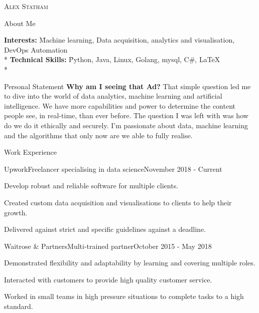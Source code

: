 \documentclass[a4paper]{article}
\newlength{\tabin}
\newlength{\secsep}
\newcommand{\lineunder}{\vspace*{-8pt} \\ \hspace*{-6pt} \hrulefill \\ \vspace*{-15pt}}
\newcommand{\name}[1]{\begin{center}\textsc{\Huge#1}\\\end{center}}
\newcommand{\contact}[1]{\begin{center}\color{contactgray}{\small#1}\end{center}}
\newenvironment{tabbedsection}[1]{
  \begin{list}{}{
      \setlength{\itemsep}{0pt}
      \setlength{\labelsep}{0pt}
      \setlength{\labelwidth}{0pt}
      \setlength{\leftmargin}{\tabin}
      \setlength{\rightmargin}{\tabin}
      \setlength{\listparindent}{0pt}
      \setlength{\parsep}{0pt}
      \setlength{\parskip}{0pt}
      \setlength{\partopsep}{0pt}
      \setlength{\topsep}{#1}
    }
  \item[]
}{\end{list}}
\newenvironment{nospacetabbing}{
    \begin{tabbing}
}{\end{tabbing}\vspace{-1.2em}}
\newenvironment{resume_header}{}{\vspace{0pt}}
\newenvironment{resume_section}[1]{
  \filbreak
  \vspace{2\secsep}
  \textsc{\large#1}
  \lineunder
  \begin{tabbedsection}{\secsep}
}{\end{tabbedsection}}
\newenvironment{resume_employer}[4]{
  \vspace{\secsep}
  \textbf{#1} \\ 
  \indent {\small #2} \hfill {\footnotesize#3 (#4)}
  \begin{tabbedsection}{0pt}
  \begin{subitems}
}{\end{subitems}\end{tabbedsection}}
\newenvironment{subitems}{
  \renewcommand{\labelitemi}{-}
  \begin{itemize}
      \setlength{\labelsep}{1em}
}{\end{itemize}}
\begin{document}
\begin{resume_header}
\name{Alex Statham}
\contact{alex.staham1998@gmail.com  $\bullet$ +447490973388 $\bullet$ astatham.com}
\end{resume_header}

\begin{resume_section}{About Me}
  \begin{nospacetabbing}
  \textbf{Interests:}  \= Machine learning,  Data acquisition, analytics and visualisation, DevOps Automation \\*
  \textbf{Technical Skills:}  \= Python, Java, Linux, Golang, mysql, C\#,  \LaTeX\\*
  \end{nospacetabbing}
\end{resume_section}

\begin{resume_section}{Personal Statement}
  \textbf{Why am I seeing that Ad?} That simple question led  me to dive into the world of data analytics, machine learning and  artificial intelligence. We have more capabilities and power to determine the content people see, in real-time, than ever before. The question I was left with was how do we do it ethically and securely. I'm passionate about data, machine learning and the algorithms that only now are we able to fully realise.
\end{resume_section}

\begin{resume_section}{Work Experience}
  \begin{resume_employer}{Upwork}{Freelancer specialising in data science}{}{November 2018 - Current}
    \item Develop robust and reliable software for multiple clients.
    \item Created custom data acquisition and  visualisations to clients to help their growth.
    \item Delivered against strict and specific guidelines against a deadline.
  \end{resume_employer}
  
  \begin{resume_employer}{Waitrose \& Partners}{Multi-trained partner}{}{October 2015 - May 2018}
    \item Demonstrated flexibility and adaptability by learning and covering multiple roles.
    \item Interacted with customers to provide high quality customer service.
    \item Worked in small teams in high pressure situations to complete tasks to a high standard.
  \end{resume_employer}
\end{resume_section}
\end{document}
